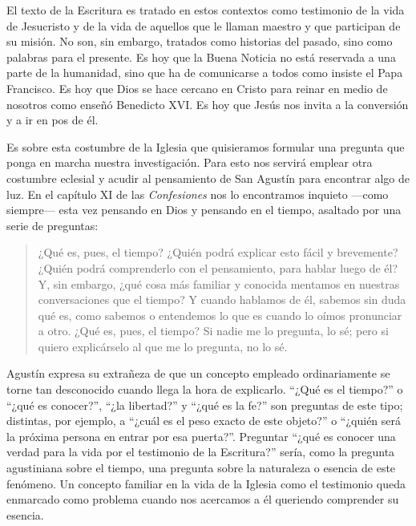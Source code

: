 El texto de la Escritura es tratado en estos contextos como testimonio de la
vida de Jesucristo y de la vida de aquellos que le llaman maestro y que
participan de su misión. No son, sin embargo, tratados como historias del
pasado, sino como palabras para el presente. Es hoy que la Buena Noticia no está
reservada a una parte de la humanidad, sino que ha de comunicarse a todos como
insiste el Papa Francisco. Es hoy que Dios se hace cercano en Cristo para reinar
en medio de nosotros como enseñó Benedicto XVI. Es hoy que Jesús nos invita a la
conversión y a ir en pos de él.

Es sobre esta costumbre de la Iglesia que quisieramos formular una pregunta que
ponga en marcha nuestra investigación. Para esto nos servirá emplear otra
costumbre eclesial y acudir al pensamiento de San Agustín para encontrar algo de
luz. En el capítulo XI de las \emph{Confesiones} nos lo encontramos inquieto
---como siempre--- esta vez pensando en Dios y pensando en el tiempo, asaltado
por una serie de preguntas:

\blockquote[{\cite[XI.14 n.17]{confesiones}}]{¿Qué es, pues, el tiempo? ¿Quién
  podrá explicar esto fácil y brevemente? ¿Quién podrá comprenderlo con el
  pensamiento, para hablar luego de él? Y, sin embargo, ¿qué cosa más familiar y
  conocida mentamos en nuestras conversaciones que el tiempo? Y cuando hablamos
  de él, sabemos sin duda qué es, como sabemos o entendemos lo que es cuando lo
  oímos pronunciar a otro. ¿Qué es, pues, el tiempo? Si nadie me lo pregunta, lo
  sé; pero si quiero explicárselo al que me lo pregunta, no lo sé.}

Agustín expresa su extrañeza de que un concepto empleado ordinariamente se torne
tan desconocido cuando llega la hora de explicarlo. \enquote{¿Qué es el tiempo?}
o \enquote{¿qué es conocer?}, \enquote{¿la libertad?} y \enquote{¿qué es la fe?}
son preguntas de este tipo; distintas, por ejemplo, a \enquote{¿cuál es el peso
  exacto de este objeto?} o \enquote{¿quién será la próxima persona en entrar
  por esa puerta?}.\autocite[Cf.][304]{wittgenstein2005bt} Preguntar
\enquote{¿qué es conocer una verdad para la vida por el testimonio de la
  Escritura?} sería, como la pregunta agustiniana sobre el tiempo, una pregunta
sobre la naturaleza o esencia de este fenómeno. Un concepto familiar en la vida
de la Iglesia como el testimonio queda enmarcado como problema cuando nos
acercamos a él queriendo comprender su esencia.

